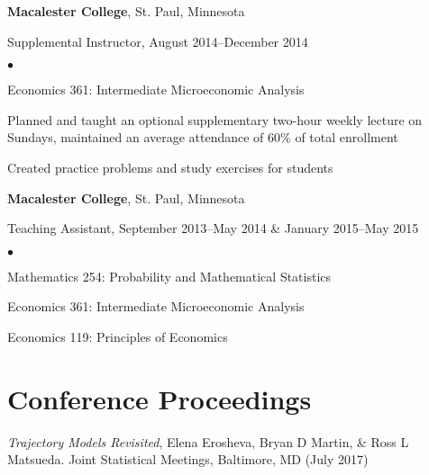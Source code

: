 \documentclass[margin,centered]{res}
\newenvironment{list1}{
  \begin{list}{\ding{113}}{%
      \setlength{\itemsep}{0in}
      \setlength{\parsep}{0in} \setlength{\parskip}{0in}
      \setlength{\topsep}{0in} \setlength{\partopsep}{0in}
      \setlength{\leftmargin}{0.17in}}}{\end{list}}
\newenvironment{list2}{
  \begin{list}{$\bullet$}{%
      \setlength{\itemsep}{0in}
      \setlength{\parsep}{0in} \setlength{\parskip}{0in}
      \setlength{\topsep}{0in} \setlength{\partopsep}{0in}
      \setlength{\leftmargin}{0.2in}}}{\end{list}}
\begin{document}
\begin{resume}
{\bf Macalester College}, St. Paul, Minnesota
\begin{list1}
\item[] Supplemental Instructor, August 2014--December 2014
\begin{list2}
\vspace*{.05in}
\item Economics 361: Intermediate Microeconomic Analysis
\item Planned and taught an optional supplementary two-hour weekly lecture on Sundays, maintained an average attendance of 60\% of total enrollment
\item Created practice problems and study exercises for students
\end{list2}
\end{list1}

{\bf Macalester College}, St. Paul, Minnesota
\begin{list1}
\item[] Teaching Assistant, September 2013--May 2014 \& January 2015--May 2015
\begin{list2}
\vspace*{.05in}
\item Mathematics 254: Probability and Mathematical Statistics
\item Economics 361: Intermediate Microeconomic Analysis
\item Economics 119: Principles of Economics
\end{list2}
\end{list1}



\section{\sc Conference Proceedings}
\emph{Trajectory Models Revisited}, Elena Erosheva, Bryan D Martin, \& Ross L Matsueda. Joint Statistical Meetings, Baltimore, MD (July 2017)


\end{resume}
\end{document}
